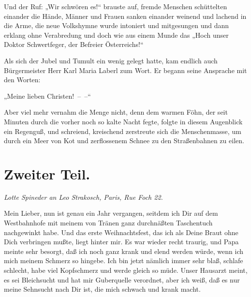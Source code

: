 Und der Ruf: „Wir schwören es!“ brauste auf, fremde Menschen
schüttelten einander die Hände, Männer und Frauen sanken einander
weinend und lachend in die Arme, die neue Volkshymne wurde
intoniert und mitgesungen und dann erklang ohne Verabredung und
doch wie aus einem Munde das „Hoch unser Doktor Schwertfeger, der
Befreier Österreichs!“

Als sich der Jubel und Tumult ein wenig gelegt
hatte, kam endlich auch Bürgermeister Herr Karl Maria Laberl zum
Wort. Er begann seine Ansprache mit den Worten:

„Meine lieben Christen!~–~–“

Aber viel mehr vernahm die Menge nicht, denn dem warmen Föhn, der
seit Minuten durch die vorher noch so kalte Nacht fegte, folgte in
diesem Augenblick ein Regenguß, und schreiend, kreischend
zerstreute sich die Menschenmasse, um durch ein Meer von Kot und
zerflossenem Schnee zu den Straßenbahnen zu eilen.

\chapter{Zweiter Teil.}

\begin{center}
\textit{Lotte Spineder an Leo Strakosch, Paris, Rue Foch 22.}

\end{center}
Mein Lieber, nun ist genau ein Jahr vergangen, seitdem ich Dir auf
dem Westbahnhofe mit meinem von Tränen ganz durchnäßten Taschentuch
nachgewinkt habe. Und das erste Weihnachtsfest, das ich als Deine
Braut ohne Dich verbringen mußte, liegt hinter mir. Es war wieder
recht traurig, und Papa meinte sehr besorgt, daß ich noch ganz
krank und elend werden würde, wenn ich mich meinem Schmerz so
hingebe. Ich bin jetzt nämlich immer sehr blaß, schlafe schlecht,
habe viel Kopfschmerz und werde gleich so müde. Unser Hausarzt
meint, es sei Bleichsucht und hat mir Guberquelle verordnet, aber
ich weiß, daß es nur meine Sehnsucht nach Dir ist, die mich schwach
und krank macht.

